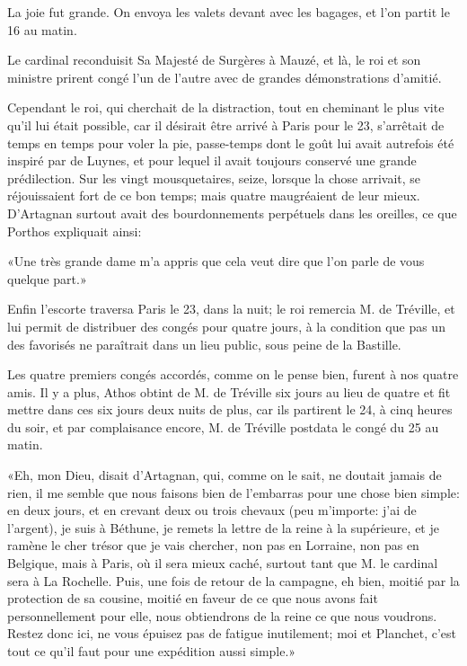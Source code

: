 La joie fut grande. On envoya les valets devant avec les bagages, et l'on partit le 16 au matin. 

Le cardinal reconduisit Sa Majesté de Surgères à Mauzé, et là, le roi et son ministre prirent congé l'un de l'autre avec de grandes démonstrations d'amitié. 

Cependant le roi, qui cherchait de la distraction, tout en cheminant le plus vite qu'il lui était possible, car il désirait être arrivé à Paris pour le 23, s'arrêtait de temps en temps pour voler la pie, passe-temps dont le goût lui avait autrefois été inspiré par de Luynes, et pour lequel il avait toujours conservé une grande prédilection. Sur les vingt mousquetaires, seize, lorsque la chose arrivait, se réjouissaient fort de ce bon temps; mais quatre maugréaient de leur mieux. D'Artagnan surtout avait des bourdonnements perpétuels dans les oreilles, ce que Porthos expliquait ainsi: 

«Une très grande dame m'a appris que cela veut dire que l'on parle de vous quelque part.» 

Enfin l'escorte traversa Paris le 23, dans la nuit; le roi remercia M. de Tréville, et lui permit de distribuer des congés pour quatre jours, à la condition que pas un des favorisés ne paraîtrait dans un lieu public, sous peine de la Bastille. 

Les quatre premiers congés accordés, comme on le pense bien, furent à nos quatre amis. Il y a plus, Athos obtint de M. de Tréville six jours au lieu de quatre et fit mettre dans ces six jours deux nuits de plus, car ils partirent le 24, à cinq heures du soir, et par complaisance encore, M. de Tréville postdata le congé du 25 au matin. 

«Eh, mon Dieu, disait d'Artagnan, qui, comme on le sait, ne doutait jamais de rien, il me semble que nous faisons bien de l'embarras pour une chose bien simple: en deux jours, et en crevant deux ou trois chevaux (peu m'importe: j'ai de l'argent), je suis à Béthune, je remets la lettre de la reine à la supérieure, et je ramène le cher trésor que je vais chercher, non pas en Lorraine, non pas en Belgique, mais à Paris, où il sera mieux caché, surtout tant que M. le cardinal sera à La Rochelle. Puis, une fois de retour de la campagne, eh bien, moitié par la protection de sa cousine, moitié en faveur de ce que nous avons fait personnellement pour elle, nous obtiendrons de la reine ce que nous voudrons. Restez donc ici, ne vous épuisez pas de fatigue inutilement; moi et Planchet, c'est tout ce qu'il faut pour une expédition aussi simple.» 

